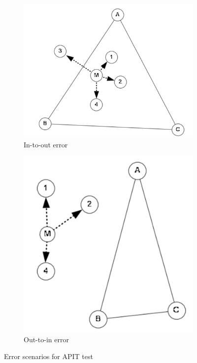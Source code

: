 \documentclass[a4paper,12pt]{article}
\begin{document}
\begin{enumerate}[label=(\alph*)]
\begin{enumerate}[label=(\roman*)]
    \begin{figure}[t]
      \centering
      \begin{subfigure}{.5\textwidth}
        \centering
        \includegraphics[width=.6\linewidth]{img/in-to-out-error}
        \caption{\label{fig:in-to-out}In-to-out error}
      \end{subfigure}%
      \begin{subfigure}{.5\textwidth}
        \centering
        \includegraphics[width=.6\linewidth]{img/out-to-in-error}
        \caption{\label{fig:out-to-in}Out-to-in error}
      \end{subfigure}
      \caption{Error scenarios for APIT test}
    \end{figure}



\end{enumerate}
\end{enumerate}
\end{document}
